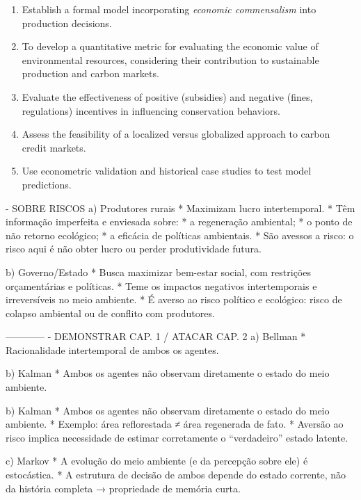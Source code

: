 \newpage


\begin{enumerate}
    \item Establish a formal model incorporating \textit{economic commensalism} into production decisions.
    \item To develop a quantitative metric for evaluating the economic value of environmental resources, considering their contribution to sustainable production and carbon markets.
    \item Evaluate the effectiveness of positive (subsidies) and negative (fines, regulations) incentives in influencing conservation behaviors.
    \item Assess the feasibility of a localized versus globalized approach to carbon credit markets.
    \item Use econometric validation and historical case studies to test model predictions.
\end{enumerate}

- SOBRE RISCOS
a) Produtores rurais
* Maximizam lucro intertemporal.
* Têm informação imperfeita e enviesada sobre:
* a regeneração ambiental;
* o ponto de não retorno ecológico;
* a eficácia de políticas ambientais.
* São avessos a risco: o risco aqui é não obter lucro ou perder produtividade futura.

b) Governo/Estado
* Busca maximizar bem-estar social, com restrições orçamentárias e políticas.
* Teme os impactos negativos intertemporais e irreversíveis no meio ambiente.
* É averso ao risco político e ecológico: risco de colapso ambiental ou de conflito com produtores.

------------
- DEMONSTRAR CAP. 1 / ATACAR CAP. 2
a) Bellman
* Racionalidade intertemporal de ambos os agentes.

b) Kalman
* Ambos os agentes não observam diretamente o estado do meio ambiente.

b) Kalman
* Ambos os agentes não observam diretamente o estado do meio ambiente.
* Exemplo: área reflorestada ≠ área regenerada de fato.
* Aversão ao risco implica necessidade de estimar corretamente o “verdadeiro” estado latente.

c) Markov
* A evolução do meio ambiente (e da percepção sobre ele) é estocástica.
* A estrutura de decisão de ambos depende do estado corrente, não da história completa → propriedade de memória curta.

